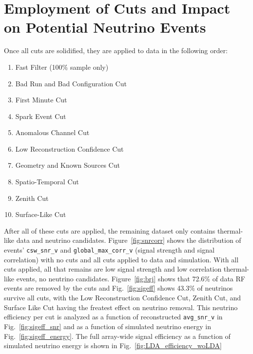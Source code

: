 \pagebreak
\section{Employment of Cuts and Impact on Potential Neutrino Events \label{sec:5sa_cleaningsummary}}

  Once all cuts are solidified, they are applied to data in the following order: 
  \begin{enumerate}
    \item Fast Filter (100\% sample only)
    \item Bad Run and Bad Configuration Cut
    \item First Minute Cut
    \item Spark Event Cut
    \item Anomalous Channel Cut
    \item Low Reconstruction Confidence Cut
    \item Geometry and Known Sources Cut
    \item Spatio-Temporal Cut
    \item Zenith Cut
    \item Surface-Like Cut
  \end{enumerate}

  After all of these cuts are applied, the remaining dataset only contains thermal-like data and neutrino candidates. 
  Figure~\ref{fig:snrcorr} shows the distribution of events' \texttt{csw\_snr\_v} and \texttt{global\_max\_corr\_v} (signal strength and signal correlation) with no cuts and all cuts applied to data and simulation. 
  With all cuts applied, all that remains are low signal strength and low correlation thermal-like events, no neutrino candidates. 
  Figure~\ref{fig:brj} shows that 72.6\% of data RF events are removed by the cuts and Fig.~\ref{fig:sigeff} shows 43.3\% of neutrinos survive all cuts, with the Low Reconstruction Confidence Cut, Zenith Cut, and Surface Like Cut having the freatest effect on neutrino removal. 
  This neutrino efficiency per cut is analyzed as a function of reconstructed \texttt{avg\_snr\_v} in Fig.~\ref{fig:sigeff_snr} and as a function of simulated neutrino energy in Fig.~\ref{fig:sigeff_energy}.
  The full array-wide signal efficiency as a function of simulated neutrino energy is shown in Fig.~\ref{fig:LDA_efficiency_woLDA} 

